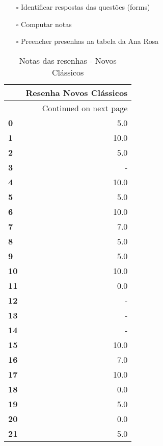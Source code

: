 \documentclass[11pt]{article}
\begin{document}
\begin{itemize}
\item[{$\square$}] Identificar respostas das questões (forms)
\item[{$\square$}] Computar notas
\item[{$\square$}] Preencher presenhas na tabela da Ana Rosa
\end{itemize}
\begin{center}
\begin{longtable}{lr}
\caption{Notas das resenhas - Novos Clássicos}\\
\toprule
{} &  Resenha Novos Clássicos \\
\midrule
\endhead
\midrule
\multicolumn{2}{r}{{Continued on next page}} \\
\midrule
\endfoot

\bottomrule
\endlastfoot
\textbf{0 } &                      5.0 \\
\textbf{1 } &                     10.0 \\
\textbf{2 } &                      5.0 \\
\textbf{3 } &                        - \\
\textbf{4 } &                     10.0 \\
\textbf{5 } &                      5.0 \\
\textbf{6 } &                     10.0 \\
\textbf{7 } &                      7.0 \\
\textbf{8 } &                      5.0 \\
\textbf{9 } &                      5.0 \\
\textbf{10} &                     10.0 \\
\textbf{11} &                      0.0 \\
\textbf{12} &                        - \\
\textbf{13} &                        - \\
\textbf{14} &                        - \\
\textbf{15} &                     10.0 \\
\textbf{16} &                      7.0 \\
\textbf{17} &                     10.0 \\
\textbf{18} &                      0.0 \\
\textbf{19} &                      5.0 \\
\textbf{20} &                      0.0 \\
\textbf{21} &                      5.0 \\

\end{longtable}
\end{center}
\end{document}
